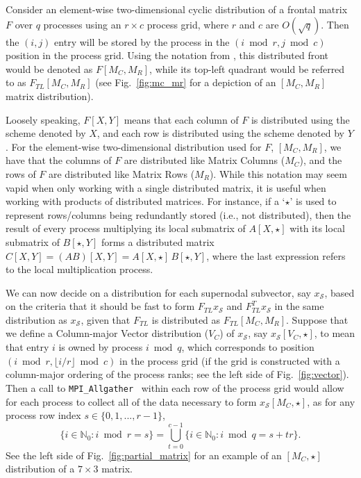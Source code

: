 Consider an element-wise two-dimensional cyclic distribution 
\cite{Poulson-elemental} of a frontal matrix $F$ over $q$ processes using an 
$r \times c$ process grid, where $r$ and $c$ are $O(\sqrt{q})$. Then the 
$(i,j)$ entry will be stored by the process in the $(i \bmod r,j \bmod c)$ 
position in the process grid. 
Using the notation from \cite{Poulson-elemental}, this distributed front would 
be denoted as $F[M_C,M_R]$, while its top-left quadrant would be referred to 
as $F_{TL}[M_C,M_R]$ (see Fig.~\ref{fig:mc_mr} for a depiction of an $[M_C,M_R]$ matrix distribution). 



Loosely speaking, $F[X,Y]$ means that each column
of $F$ is distributed using the scheme denoted by $X$, and each row
is distributed using the scheme denoted by $Y$. For the element-wise 
two-dimensional distribution used for $F$, $[M_C,M_R]$, we have that the 
columns of $F$ are distributed like Matrix Columns ($M_C$), and the rows 
of $F$ are distributed like Matrix Rows ($M_R$). While this notation may seem
vapid when only working with a single distributed matrix, it is useful when
working with products of distributed matrices. For instance, if a `$\star$' is 
used to represent rows/columns being redundantly stored (i.e., not distributed),
then the result of every process multiplying its local submatrix of 
$A[X,\star]$ with its local submatrix of $B[\star,Y]$ forms a distributed
matrix $C[X,Y] = (AB)[X,Y] = A[X,\star]\, B[\star,Y]$, where the last 
expression refers to the local multiplication process.

We can now decide on a distribution for each supernodal subvector, say 
$x_{\mathcal{S}}$, based on the criteria that it should be fast to 
form $F_{TL} x_{\mathcal{S}}$ and $F_{TL}^T x_{\mathcal{S}}$ in the same 
distribution as $x_{\mathcal{S}}$, given that $F_{TL}$ is distributed as 
$F_{TL}[M_C,M_R]$. Suppose that we define a Column-major Vector distribution 
($V_C$) of $x_{\mathcal{S}}$, say $x_{\mathcal{S}}[V_C,\star]$, to 
mean that entry $i$ is owned by process $i \bmod q$, which corresponds 
to position $(i \bmod r,\lfloor i/r \rfloor \bmod c)$ in the process grid 
(if the grid is constructed with a column-major ordering of the process ranks; 
 see the left side of Fig.~\ref{fig:vector}).
Then a call to \verb!MPI_Allgather!~\cite{Dongarra-mpi} within each row of the 
process grid would allow for each process to collect all of the data necessary 
to form $x_{\mathcal{S}}[M_C,\star]$, as for any process row index 
$s \in \{0,1,...,r-1\}$,
\begin{equation}\label{vc-to-mc}
  \{ i \in \mathbb{N}_0 : i \bmod r = s \} = 
  \bigcup_{t=0}^{c-1} \{ i \in \mathbb{N}_0 : i \bmod q = s+tr \}.
\end{equation}
See the left side of Fig.~\ref{fig:partial_matrix} for an example of an 
$[M_C,\star]$ distribution of a $7 \times 3$ matrix.

